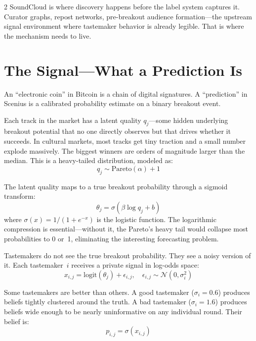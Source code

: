 \documentclass[9pt,oneside]{amsart}
\begin{document}
\begin{multicols}{2}
SoundCloud is where discovery happens before the label system captures it. Curator graphs, repost networks, pre-breakout audience formation---the upstream signal environment where tastemaker behavior is already legible. That is where the mechanism needs to live.

\section{The Signal---What a Prediction Is}

An ``electronic coin'' in Bitcoin is a chain of digital signatures. A ``prediction'' in Scenius is a calibrated probability estimate on a binary breakout event.

Each track in the market has a latent quality $q_j$---some hidden underlying breakout potential that no one directly observes but that drives whether it succeeds. In cultural markets, most tracks get tiny traction and a small number explode massively. The biggest winners are orders of magnitude larger than the median. This is a heavy-tailed distribution, modeled as:
\begin{equation}
  q_j \sim \text{Pareto}(\alpha) + 1
\end{equation}

The latent quality maps to a true breakout probability through a sigmoid transform:
\begin{equation}
  \theta_j = \sigma(\beta \log q_j + b)
\end{equation}
where $\sigma(x) = 1/(1 + e^{-x})$ is the logistic function. The logarithmic compression is essential---without it, the Pareto's heavy tail would collapse most probabilities to 0 or~1, eliminating the interesting forecasting problem.

Tastemakers do not see the true breakout probability. They see a noisy version of it. Each tastemaker~$i$ receives a private signal in log-odds space:
\begin{equation}
  x_{i,j} = \text{logit}(\theta_j) + \epsilon_{i,j}, \quad \epsilon_{i,j} \sim \mathcal{N}(0, \sigma_i^2)
\end{equation}

Some tastemakers are better than others. A good tastemaker ($\sigma_i = 0.6$) produces beliefs tightly clustered around the truth. A bad tastemaker ($\sigma_i = 1.6$) produces beliefs wide enough to be nearly uninformative on any individual round. Their belief is:
\begin{equation}
  p_{i,j} = \sigma(x_{i,j})
\end{equation}


\end{multicols}
\end{document}
